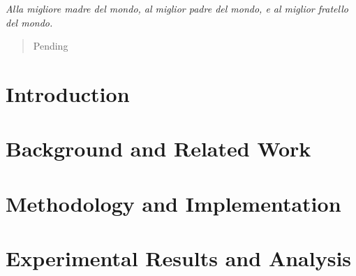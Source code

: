 \documentclass[12pt,a4paper,openright,twoside]{report}
\begin{document}

\clearpage{\pagestyle{empty}\cleardoublepage}
\begin{titlepage}
	\setcounter{page}{3}
	\thispagestyle{empty}
	\topmargin=6.5cm
	\raggedleft
	\large
	\em
	Alla migliore madre del mondo,\linebreak
	al miglior padre del mondo,\linebreak
	e al miglior fratello del mondo.
	\newpage
	\clearpage{\pagestyle{empty}\cleardoublepage}
\end{titlepage}
\clearpage{\pagestyle{empty}\cleardoublepage}
\begin{abstract}
	\setcounter{page}{3}
	Pending
\end{abstract}
\clearpage{\pagestyle{empty}\cleardoublepage}
\clearpage{\pagestyle{empty}\cleardoublepage}
\tableofcontents
{}
\listoffigures
\clearpage{\pagestyle{empty}\cleardoublepage}

\clearpage{\pagestyle{empty}\cleardoublepage}

\chapter{Introduction}
\label{chap:intro}
\lhead[\fancyplain{}{\bfseries\thepage}]{\fancyplain{}{\bfseries\rightmark}}


\chapter{Background and Related Work}
\label{chap:background}
\lhead[\fancyplain{}{\bfseries\thepage}]{\fancyplain{}{\bfseries\rightmark}}


\chapter{Methodology and Implementation}
\label{chap:methodology}
\lhead[\fancyplain{}{\bfseries\thepage}]{\fancyplain{}{\bfseries\rightmark}}


\chapter{Experimental Results and Analysis}
\label{chap:results}
\lhead[\fancyplain{}{\bfseries\thepage}]{\fancyplain{}{\bfseries\rightmark}}

\end{document}
